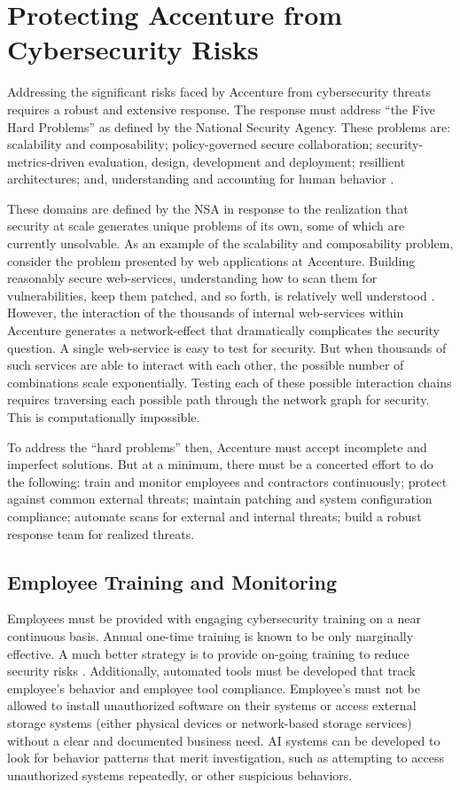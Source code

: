\section{Protecting Accenture from Cybersecurity Risks}

Addressing the significant risks faced by Accenture from cybersecurity threats requires a robust and extensive response. The response must address ``the Five Hard Problems'' as defined by the National Security Agency. These problems are: scalability and composability; policy-governed secure collaboration; security-metrics-driven evaluation, design, development and deployment; resillient architectures; and, understanding and accounting for human behavior \parencite{scalaRiskFiveHard2019}. 

These domains are defined by the NSA in response to the realization that security at scale generates unique problems of its own, some of which are currently unsolvable. As an example of the scalability and composability problem, consider the problem presented by web applications at Accenture. Building reasonably secure web-services, understanding how to scan them for vulnerabilities, keep them patched, and so forth, is relatively well understood \parencite{krohnBuildingFastSecure2006}. However, the interaction of the thousands of internal web-services within Accenture generates a network-effect that dramatically complicates the security question. A single web-service is easy to test for security. But when thousands of such services are able to interact with each other, the possible number of combinations scale exponentially. Testing each of these possible interaction chains requires traversing each possible path through the network graph for security. This is computationally impossible.

To address the ``hard problems'' then, Accenture must accept incomplete and imperfect solutions. But at a minimum, there must be a concerted effort to do the following: train and monitor employees and contractors continuously; protect against common external threats; maintain patching and system configuration compliance; automate scans for external and internal threats; build a robust response team for realized threats.

\subsection{Employee Training and Monitoring}

Employees must be provided with engaging cybersecurity training on a near continuous basis. Annual one-time training is known to be only marginally effective. A much better strategy is to provide on-going training to reduce security risks \parencite{hannaExploringCybersecurityAwareness2020}. Additionally, automated tools must be developed that track employee's behavior and employee tool compliance. Employee's must not be allowed to install unauthorized software on their systems or access external storage systems (either physical devices or network-based storage services) without a clear and documented business need. AI systems can be developed to look for behavior patterns that merit investigation, such as attempting to access unauthorized systems repeatedly, or other suspicious behaviors.

